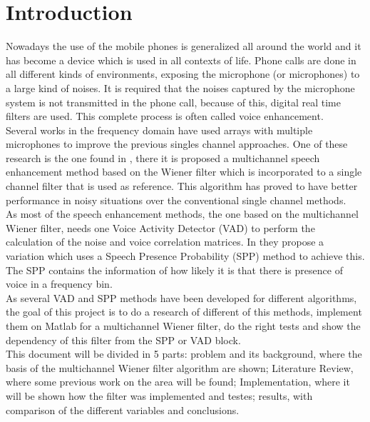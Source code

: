 \chapter{Introduction}

Nowadays the use of the mobile phones is generalized all around the world and it has become a device which is used in all contexts of life. Phone calls are done in all different kinds of environments, exposing the microphone (or microphones) to a large kind of noises. It is required that the noises captured by the microphone system is not transmitted in the phone call, because of this, digital real time filters are used. This complete process is often called voice enhancement.\\

Several works in the frequency domain have used arrays with multiple microphones to improve the previous singles channel approaches. One of these research is the one found in \cite{Yong2013}, there it is proposed a multichannel speech enhancement method based on the Wiener filter which is incorporated to a single channel filter that is used as reference. This algorithm has proved to have better performance in noisy situations over the conventional single channel methods. \\

As most of the speech enhancement methods, the one based on the multichannel Wiener filter, needs one Voice Activity Detector (VAD) to perform the calculation of the noise and voice correlation matrices. In \cite{Yong2013} they propose a variation which uses a Speech Presence Probability (SPP) method to achieve this. The SPP contains the information of how likely it is that there is presence of voice in a frequency bin.\\

As several VAD and SPP methods have been developed for different algorithms, the goal of this project is to do a research of different of this methods, implement them on Matlab for a multichannel Wiener filter, do the right tests and show the dependency of this filter from the SPP or VAD block.\\

This document will be divided in 5 parts: problem and its background, where the basis of the multichannel Wiener filter algorithm are shown; Literature Review, where some previous work on the area will be found; Implementation, where it will be shown how the filter was implemented and testes; results, with comparison of the different variables and conclusions. 






